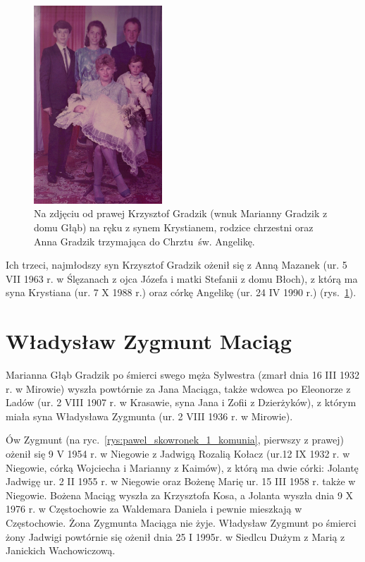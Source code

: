 \begin{figure}[!h]
\begin{center}
\includegraphics[width=0.43\textwidth]{zdjecia/chrzest_angeliki_gradzik.jpg}
\caption[Chrzest św. Angeliki Gradzik]{Na zdjęciu od prawej Krzysztof Gradzik (wnuk Marianny Gradzik z domu Głąb) na ręku z synem Krystianem, rodzice chrzestni oraz Anna Gradzik trzymająca do Chrztu~św. Angelikę.}
\label{rys:chrzest_angeliki_gradzik}
\end{center}
\end{figure}

Ich trzeci, najmłodszy syn Krzysztof Gradzik ożenił się z Anną Mazanek (ur. 5 VII 1963 r. w Ślęzanach z ojca Józefa i matki Stefanii z domu Błoch), z którą ma syna Krystiana (ur. 7 X 1988 r.) oraz córkę Angelikę (ur. 24 IV 1990 r.) (rys.~\ref{rys:chrzest_angeliki_gradzik}).




\section{Władysław Zygmunt Maciąg}
Marianna Głąb Gradzik po śmierci swego męża Sylwestra (zmarł dnia 16 III  1932 r. w Mirowie) wyszła powtórnie za Jana Maciąga, także wdowca po Eleonorze z Ladów (ur. 2 VIII 1907 r. w Krasawie, syna Jana i Zofii z Dzierżyków), z którym miała syna Władysława Zygmunta (ur. 2 VIII 1936 r. w Mirowie).


Ów Zygmunt (na ryc.~\ref{rys:pawel_skowronek_1_komunia}, pierwszy z prawej) ożenił się 9 V 1954 r. w Niegowie z Jadwigą Rozalią Kołacz (ur.12 IX 1932 r. w Niegowie, córką Wojciecha i Marianny z Kaimów), z którą ma dwie córki: Jolantę Jadwigę ur. 2 II 1955 r. w Niegowie oraz Bożenę Marię ur. 15 III 1958 r. także w Niegowie. Bożena Maciąg wyszła za Krzysztofa Kosa, a Jolanta wyszła dnia 9 X 1976 r. w Częstochowie za Waldemara Daniela i pewnie mieszkają w Częstochowie. Żona Zygmunta Maciąga nie żyje. Władysław Zygmunt po śmierci żony Jadwigi powtórnie się ożenił dnia 25 I 1995r. w Siedlcu Dużym z Marią z Janickich Wachowiczową.

